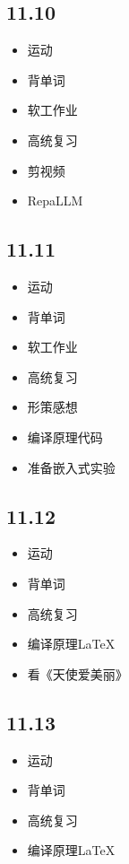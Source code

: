 \documentclass[UTF8]{ctexart}
\begin{document}
\subsection*{11.10}
\begin{itemize}
    \item 运动
    \item 背单词
    \item 软工作业
    \item 高统复习
    \item 剪视频
    \item RepaLLM
\end{itemize}

\subsection*{11.11}
\begin{itemize}
    \item 运动
    \item 背单词
    \item 软工作业
    \item 高统复习
    \item 形策感想
    \item 编译原理代码
    \item 准备嵌入式实验
\end{itemize}

\subsection*{11.12}
\begin{itemize}
    \item 运动
    \item 背单词
    \item 高统复习
    \item 编译原理LaTeX
    \item 看《天使爱美丽》
\end{itemize}

\subsection*{11.13}
\begin{itemize}
    \item 运动
    \item 背单词
    \item 高统复习
    \item 编译原理LaTeX
\end{itemize}
\end{document}
